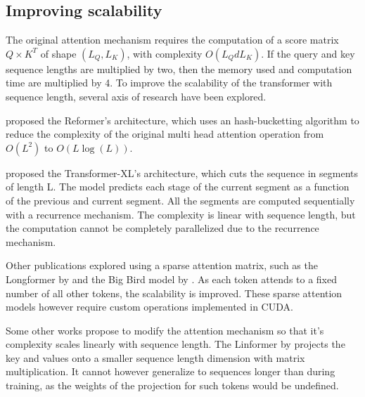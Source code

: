 \subsection{Improving scalability}

The original attention mechanism requires the computation of a score
matrix $Q \times K^T$ of shape $(L_Q, L_K)$, with complexity
$O(L_QdL_K)$. If the query and key sequence lengths are multiplied by
two, then the memory used and computation time are multiplied by 4. To
improve the scalability of the transformer with sequence length, several axis of research have been explored.

\citet{kitaev2020reformer} proposed
the Reformer's architecture, which uses an hash-bucketting algorithm to
reduce the complexity of the original multi head attention operation
from $O(L^2)$ to $O(L\log(L))$.

\citet{dai2019transformerxl} proposed the
Transformer-XL's architecture, which cuts the sequence in segments of
length L. The model predicts each stage of the current segment as a
function of the previous and current segment. All the segments are
computed sequentially with a recurrence mechanism. The complexity is linear
with sequence length, but the computation cannot be completely
 parallelized due to the recurrence mechanism.

Other publications explored using a sparse attention matrix, such as the
 Longformer by \citet{beltagy2020longformer} and the Big Bird model by
 \citet{zaheer2021big}. As each
token attends to a fixed number of all other tokens, the scalability is
improved. These sparse attention models however require custom
operations implemented in CUDA.

Some other works propose to modify the attention mechanism so that it's complexity scales linearly with sequence length. The Linformer by
\citet{wang2020linformer} projects the
 key and values onto a smaller sequence length dimension with matrix
 multiplication. It cannot however generalize to sequences longer than
 during training, as the weights of the projection for such tokens would
 be undefined.

